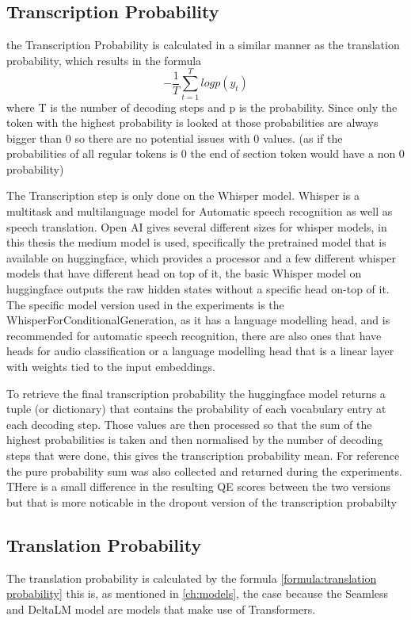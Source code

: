 \subsection{Transcription Probability}
the Transcription Probability is calculated in a similar manner as the translation probability, which results in the formula $$-\frac{1}{T}\sum_{t=1}^T log p(y_t)$$ where T is the number of decoding steps and p is the probability.
Since only the token with the highest probability is looked at those probabilities are always bigger than 0 so there are no potential issues with 0 values. (as if the probabilities of all regular tokens is 0 the end of section token would have a non 0 probability)

The Transcription step is only done on the Whisper model.
Whisper \cite{radford2022robust} is a multitask and multilanguage model for Automatic speech recognition as well as speech translation. 
Open AI gives several different sizes for whisper models, in this thesis the medium model is used, specifically the pretrained model that is available on huggingface, which provides a processor and a few different whisper models that have different head on top of it, the basic Whisper model on huggingface outputs the raw hidden states without a specific head on-top of it. 
The specific model version used in the experiments is the WhisperForConditionalGeneration, as it has a language modelling head, and is recommended for automatic speech recognition, there are also ones that have heads for audio classification or a language modelling head that is a linear layer with weights tied to the input embeddings. 

To retrieve the final transcription probability the huggingface model returns a tuple (or dictionary) that contains the probability of each vocabulary entry at each decoding step.
Those values are then processed so that the sum of the highest probabilities is taken and then normalised by the number of decoding steps that were done, this gives the transcription probability mean. For reference the pure probability sum was also collected and returned during the experiments. 
THere is a small difference in the resulting QE scores between the two versions but that is more noticable in the dropout version of the transcription probabilty 

\subsection{Translation Probability}\label{sect:translationprob}
The translation probability is calculated by the formula \autoref{formula:translation probability} this is, as mentioned in \autoref{ch:models}, the case because the Seamless and DeltaLM model are models that make use of Transformers. 

